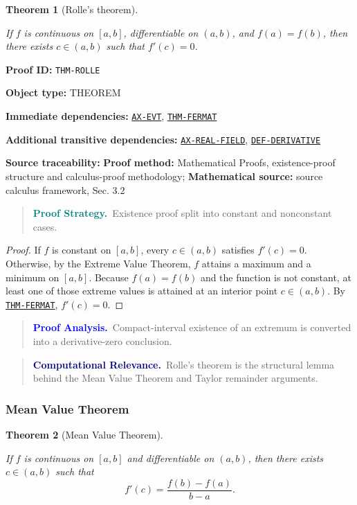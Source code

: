 \documentclass[10pt]{article}
\newcommand{\pidraw}[1]{\begingroup\urlstyle{tt}\nolinkurl{#1}\endgroup}
\newcommand{\pidref}[1]{\hyperref[prf:#1]{\pidraw{#1}}}
\newcommand{\pid}[1]{\pidref{#1}}
\newtheorem{theorem}{Theorem}[section]
\theoremstyle{definition}
\theoremstyle{remark}
\newenvironment{proofstrategy}
{\begin{quote}\small\noindent\textbf{\textcolor{teal}{Proof Strategy.}}\ }
{\end{quote}}
\newenvironment{proofanalysis}
{\begin{quote}\small\noindent\textbf{\textcolor{blue}{Proof Analysis.}}\ }
{\end{quote}}
\newenvironment{computationalrelevance}
{\begin{quote}\small\noindent\textbf{\textcolor{navy}{Computational Relevance.}}\ }
{\end{quote}}
\newcommand{\meta}[2]{\noindent\textbf{#1:} #2\par}
\begin{document}
\begin{theorem}[Rolle's theorem]\label{prf:THM-ROLLE}

If $f$ is continuous on $[a,b]$, differentiable on $(a,b)$, and $f(a)=f(b)$, then there exists $c\in(a,b)$ such that $f'(c)=0$.

\end{theorem}

\meta{Proof ID}{\pidraw{THM-ROLLE}}
\meta{Object type}{THEOREM}
\meta{Immediate dependencies}{\pidref{AX-EVT}, \pidref{THM-FERMAT}}
\meta{Additional transitive dependencies}{\pidref{AX-REAL-FIELD}, \pidref{DEF-DERIVATIVE}}
\meta{Source traceability}{\textbf{Proof method:} Mathematical Proofs, existence-proof structure and calculus-proof methodology; \textbf{Mathematical source:} source calculus framework, Sec. 3.2}

\begin{proofstrategy}Existence proof split into constant and nonconstant cases.\end{proofstrategy}

\begin{proof}

If $f$ is constant on $[a,b]$, every $c\in(a,b)$ satisfies $f'(c)=0$.
Otherwise, by the Extreme Value Theorem, $f$ attains a maximum and a minimum
on $[a,b]$. Because $f(a)=f(b)$ and the function is not constant, at least one
of those extreme values is attained at an interior point $c\in(a,b)$.
By \pid{THM-FERMAT}, $f'(c)=0$.

\end{proof}

\begin{proofanalysis}Compact-interval existence of an extremum is converted into a derivative-zero conclusion.\end{proofanalysis}

\begin{computationalrelevance}Rolle's theorem is the structural lemma behind the Mean Value Theorem and Taylor remainder arguments.\end{computationalrelevance}

\subsubsection{Mean Value Theorem}

\begin{theorem}[Mean Value Theorem]\label{prf:THM-MVT}

If $f$ is continuous on $[a,b]$ and differentiable on $(a,b)$, then there exists $c\in(a,b)$ such that
\[
f'(c)=\frac{f(b)-f(a)}{b-a}.
\]

\end{theorem}
\end{document}
